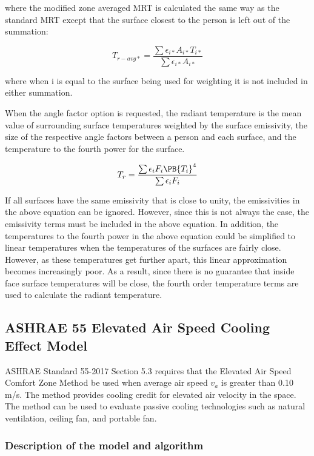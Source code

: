 where the modified zone averaged MRT is calculated the same way as the standard MRT except that the surface closest to the person is left out of the summation:

\begin{equation}
{T_{r - avg*}} = \frac{\sum{{{\epsilon}_{i*}}{{A}_{i*}}{{T}_{i*}}}}{\sum{{{\epsilon}_{i*}}{{A}_{i*}}}}
\end{equation}

where when i is equal to the surface being used for weighting it is not included in either summation.

When the angle factor option is requested, the radiant temperature is the mean value of surrounding surface temperatures weighted by the surface emissivity, the size of the respective angle factors between a person and each surface, and the temperature to the fourth power for the surface.

\begin{equation}
{T_r} = \frac{\sum{{\epsilon_{i}}{F_{i}}{\PB{{T_{i}}}^4}}}{\sum{{\epsilon_{i}}{F_{i}}}}
\end{equation}

If all surfaces have the same emissivity that is close to unity, the emissivities in the above equation can be ignored.  However, since this is not always the case, the emissivity terms must be included in the above equation.  In addition, the temperatures to the fourth power in the above equation could be simplified to linear temperatures when the temperatures of the surfaces are fairly close.  However, as these temperatures get further apart, this linear approximation becomes increasingly poor.  As a result, since there is no guarantee that inside face surface temperatures will be close, the fourth order temperature terms are used to calculate the radiant temperature.

\subsection{ASHRAE 55 Elevated Air Speed Cooling Effect Model}\label{elevated-air-speed-ce-model}

ASHRAE Standard 55-2017 Section 5.3 requires that the Elevated Air Speed Comfort Zone Method be used when average air speed \(v_{a}\) is greater than 0.10 m/s. The method provides cooling credit for elevated air velocity in the space. The method can be used to evaluate passive cooling technologies such as natural ventilation, ceiling fan, and portable fan.

\subsubsection{Description of the model and algorithm}\label{description-of-the-model-and-algorithm-4}

